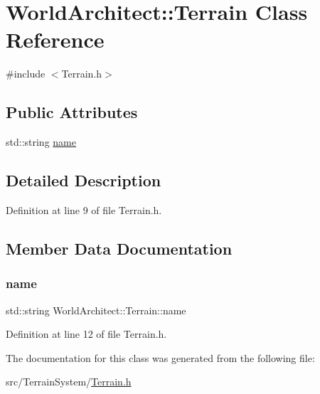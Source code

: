 \hypertarget{class_world_architect_1_1_terrain}{}\section{World\+Architect\+::Terrain Class Reference}
\label{class_world_architect_1_1_terrain}


{\ttfamily \#include $<$Terrain.\+h$>$}

\subsection*{Public Attributes}
\begin{DoxyCompactItemize}
\item 
std\+::string \mbox{\hyperlink{class_world_architect_1_1_terrain_ab7f96b7d7d59e48f5f98625eb33b728a}{name}}
\end{DoxyCompactItemize}


\subsection{Detailed Description}


Definition at line 9 of file Terrain.\+h.



\subsection{Member Data Documentation}
\mbox{\label{class_world_architect_1_1_terrain_ab7f96b7d7d59e48f5f98625eb33b728a}} 
\subsubsection{\texorpdfstring{name}{name}}
{\footnotesize\ttfamily std\+::string World\+Architect\+::\+Terrain\+::name}



Definition at line 12 of file Terrain.\+h.



The documentation for this class was generated from the following file\+:\begin{DoxyCompactItemize}
\item 
src/\+Terrain\+System/\mbox{\hyperlink{_terrain_8h}{Terrain.\+h}}\end{DoxyCompactItemize}
